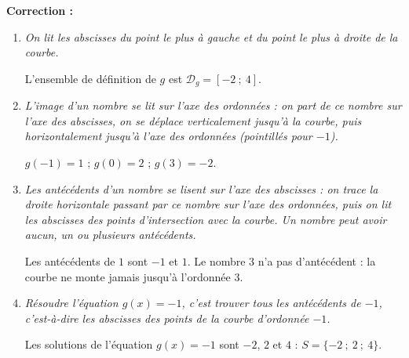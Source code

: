 \documentclass[10pt,a4paper]{article}
\begin{document}
\begin{bloc}
\textbf{Correction :}
\begin{enumerate}[leftmargin=*]
    \item \textit{On lit les abscisses du point le plus à gauche et du point le plus à droite de la courbe.}

    L'ensemble de définition de \(g\) est \(\mathcal{D}_g=[-2\ ;\ 4]\).
    \item \textit{L'image d'un nombre se lit sur l'axe des ordonnées : on part de ce nombre sur l'axe des abscisses, on se déplace verticalement jusqu'à la courbe, puis horizontalement jusqu'à l'axe des ordonnées (pointillés pour \(-1\)).}

    \(g(-1)=1\) ; \(g(0)=2\) ; \(g(3)=-2\).
    \item \textit{Les antécédents d'un nombre se lisent sur l'axe des abscisses : on trace la droite horizontale passant par ce nombre sur l'axe des ordonnées, puis on lit les abscisses des points d'intersection avec la courbe. Un nombre peut avoir aucun, un ou plusieurs antécédents.}

    Les antécédents de \(1\) sont \(-1\) et \(1\). Le nombre \(3\) n'a pas d'antécédent : la courbe ne monte jamais jusqu'à l'ordonnée \(3\).
    \item \textit{Résoudre l'équation \(g(x)=-1\), c'est trouver tous les antécédents de \(-1\), c'est-à-dire les abscisses des points de la courbe d'ordonnée \(-1\).}

    Les solutions de l'équation \(g(x)=-1\) sont \(-2\), \(2\) et \(4\) : \(S=\{-2\ ;\ 2\ ;\ 4\}\).
\end{enumerate}
\end{bloc}
\end{document}
